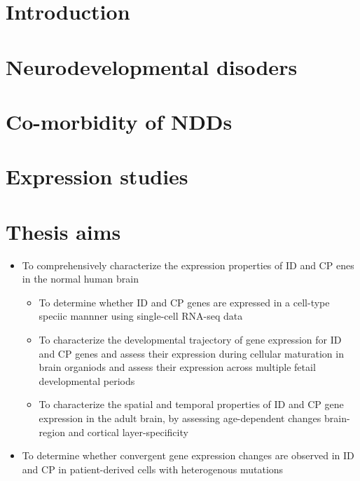 \documentclass[12pt]{article}
\begin{document}
\section{Introduction}
\section{Neurodevelopmental disoders}
\section{Co-morbidity of NDDs}
\section{Expression studies}

\section{Thesis aims}

\begin{itemize}
    \item To comprehensively characterize the expression properties of ID and CP enes in the normal human brain
    \begin{itemize}
        \item To determine whether ID and CP genes are expressed in a cell-type speciic mannner using single-cell RNA-seq data
        \item To characterize the developmental trajectory of gene expression for ID and CP genes and assess their expression during cellular maturation in brain organiods and assess their expression across multiple fetail developmental periods 
        \item  To characterize the spatial and temporal properties of ID and CP gene expression in the adult brain, by assessing age-dependent changes  brain-region and cortical layer-specificity 
        
    \end{itemize}

    \item To determine whether convergent gene expression changes are observed in ID and CP in patient-derived cells with heterogenous mutations 

\end{itemize}
\end{document}
